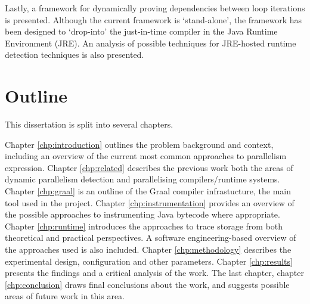 Lastly, a framework for dynamically proving dependencies between loop iterations is presented. Although the current framework is `stand-alone', the framework has been designed to `drop-into' the just-in-time compiler in the Java Runtime Environment (JRE). An analysis of possible techniques for JRE-hosted runtime detection techniques is also presented.

\section{Outline} \label{sec:introduction/outline}
This dissertation is split into several chapters.

Chapter \ref{chp:introduction} outlines the problem background and context, including an overview of the current most common approaches to parallelism expression. Chapter \ref{chp:related} describes the previous work both the areas of dynamic parallelism detection and parallelising compilers/runtime systems. Chapter \ref{chp:graal} is an outline of the Graal compiler infrastucture, the main tool used in the project. Chapter \ref{chp:instrumentation} provides an overview of the possible approaches to instrumenting Java bytecode where appropriate. Chapter \ref{chp:runtime} introduces the approaches to trace storage from both theoretical and practical perspectives. A software engineering-based overview of the approaches used is also included. Chapter \ref{chp:methodology} describes the experimental design, configuration and other parameters. Chapter \ref{chp:results} presents the findings and a critical analysis of the work. The last chapter, chapter \ref{chp:conclusion} draws final conclusions about the work, and suggests possible areas of future work in this area.